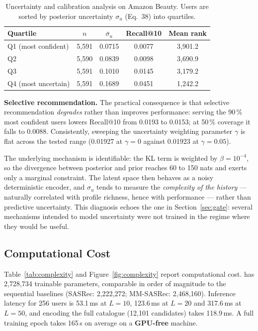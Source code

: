 \begin{table}[t]
\centering
\caption{Uncertainty and calibration analysis on Amazon Beauty. Users are sorted
by posterior uncertainty $\sigma_u$ (Eq.~38) into quartiles.}
\label{tab:uncertainty}
\small
\begin{tabular}{lcccc}
\toprule
\textbf{Quartile} & \textbf{$n$} & \textbf{$\bar{\sigma}_u$} & \textbf{Recall@10} & \textbf{Mean rank} \\
\midrule
Q1 (most confident)   & 5{,}591 & 0.0715 & 0.0077 & 3{,}901.2 \\
Q2                    & 5{,}590 & 0.0839 & 0.0098 & 3{,}690.9 \\
Q3                    & 5{,}591 & 0.1010 & 0.0145 & 3{,}179.2 \\
Q4 (most uncertain)   & 5{,}591 & 0.1689 & 0.0451 & 1{,}242.2 \\
\bottomrule
\end{tabular}
\end{table}

\textbf{Selective recommendation.} The practical consequence is that selective
recommendation \emph{degrades} rather than improves performance: serving the
90\,\% most confident users lowers Recall@10 from 0.0193 to 0.0153; at 50\,\%
coverage it falls to 0.0088. Consistently, sweeping the uncertainty weighting
parameter $\gamma$ is flat across the tested range (0.01927 at $\gamma=0$ against
0.01923 at $\gamma=0.05$).

The underlying mechanism is identifiable: the KL term is weighted by
$\beta = 10^{-4}$, so the divergence between posterior and prior reaches 60 to
150 nats and exerts only a marginal constraint. The latent space then behaves as
a noisy deterministic encoder, and $\sigma_u$ tends to measure the
\emph{complexity of the history} --- naturally correlated with profile richness,
hence with performance --- rather than predictive uncertainty. This diagnosis
echoes the one in Section~\ref{sec:gate}: several mechanisms intended to model
uncertainty were not trained in the regime where they would be useful.

\subsection{Computational Cost}
\label{sec:cost}

Table~\ref{tab:complexity} and Figure~\ref{fig:complexity} report computational
cost. \model{} has 2{,}728{,}734 trainable parameters, comparable in order of
magnitude to the sequential baselines (SASRec: 2{,}222{,}272; MM-SASRec:
2{,}468{,}160). Inference latency for 256 users is 53.1\,ms at $L=10$,
123.6\,ms at $L=20$ and 317.6\,ms at $L=50$, and encoding the full catalogue
(12{,}101 candidates) takes 118.9\,ms. A full training epoch takes 165\,s on
average on a \textbf{GPU-free} machine.

